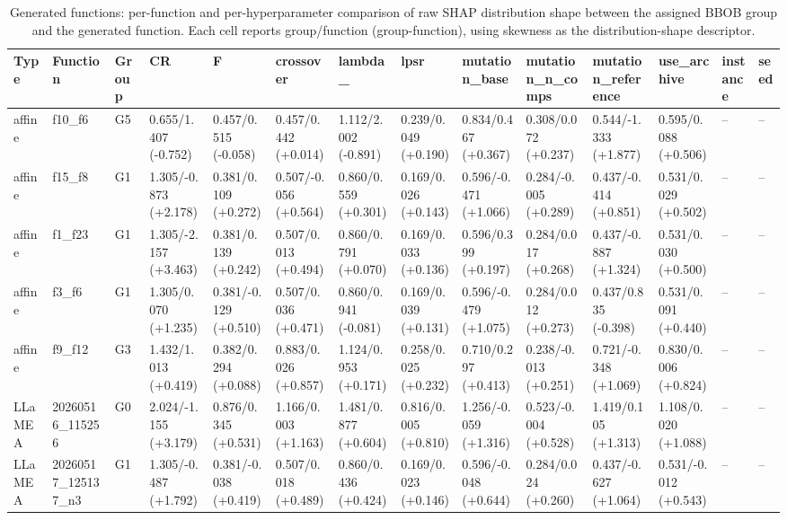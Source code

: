 \begin{table}[htbp]
\centering
\scriptsize
\setlength{\tabcolsep}{1.5pt}
\renewcommand{\arraystretch}{0.88}
\caption{Generated functions: per-function and per-hyperparameter comparison of raw SHAP distribution shape between the assigned BBOB group and the generated function. Each cell reports group/function (group-function), using skewness as the distribution-shape descriptor.}
\label{tab:generated-shap-shape-wide-0307}
\begin{adjustbox}{width=\textwidth,center}
\begin{tabular}{llllllllllllll}
\toprule
Type & Function & Group & CR & F & crossover & lambda\_ & lpsr & mutation\_base & mutation\_n\_comps & mutation\_reference & use\_archive & instance & seed \\
\midrule
affine & f10\_f6 & G5 & 0.655/1.407 (-0.752) & 0.457/0.515 (-0.058) & 0.457/0.442 (+0.014) & 1.112/2.002 (-0.891) & 0.239/0.049 (+0.190) & 0.834/0.467 (+0.367) & 0.308/0.072 (+0.237) & 0.544/-1.333 (+1.877) & 0.595/0.088 (+0.506) & -- & -- \\
affine & f15\_f8 & G1 & 1.305/-0.873 (+2.178) & 0.381/0.109 (+0.272) & 0.507/-0.056 (+0.564) & 0.860/0.559 (+0.301) & 0.169/0.026 (+0.143) & 0.596/-0.471 (+1.066) & 0.284/-0.005 (+0.289) & 0.437/-0.414 (+0.851) & 0.531/0.029 (+0.502) & -- & -- \\
affine & f1\_f23 & G1 & 1.305/-2.157 (+3.463) & 0.381/0.139 (+0.242) & 0.507/0.013 (+0.494) & 0.860/0.791 (+0.070) & 0.169/0.033 (+0.136) & 0.596/0.399 (+0.197) & 0.284/0.017 (+0.268) & 0.437/-0.887 (+1.324) & 0.531/0.030 (+0.500) & -- & -- \\
affine & f3\_f6 & G1 & 1.305/0.070 (+1.235) & 0.381/-0.129 (+0.510) & 0.507/0.036 (+0.471) & 0.860/0.941 (-0.081) & 0.169/0.039 (+0.131) & 0.596/-0.479 (+1.075) & 0.284/0.012 (+0.273) & 0.437/0.835 (-0.398) & 0.531/0.091 (+0.440) & -- & -- \\
affine & f9\_f12 & G3 & 1.432/1.013 (+0.419) & 0.382/0.294 (+0.088) & 0.883/0.026 (+0.857) & 1.124/0.953 (+0.171) & 0.258/0.025 (+0.232) & 0.710/0.297 (+0.413) & 0.238/-0.013 (+0.251) & 0.721/-0.348 (+1.069) & 0.830/0.006 (+0.824) & -- & -- \\
LLaMEA & 20260516\_115256 & G0 & 2.024/-1.155 (+3.179) & 0.876/0.345 (+0.531) & 1.166/0.003 (+1.163) & 1.481/0.877 (+0.604) & 0.816/0.005 (+0.810) & 1.256/-0.059 (+1.316) & 0.523/-0.004 (+0.528) & 1.419/0.105 (+1.313) & 1.108/0.020 (+1.088) & -- & -- \\
LLaMEA & 20260517\_125137\_n3 & G1 & 1.305/-0.487 (+1.792) & 0.381/-0.038 (+0.419) & 0.507/0.018 (+0.489) & 0.860/0.436 (+0.424) & 0.169/0.023 (+0.146) & 0.596/-0.048 (+0.644) & 0.284/0.024 (+0.260) & 0.437/-0.627 (+1.064) & 0.531/-0.012 (+0.543) & -- & -- \\

\end{tabular}
\end{adjustbox}
\end{table}
